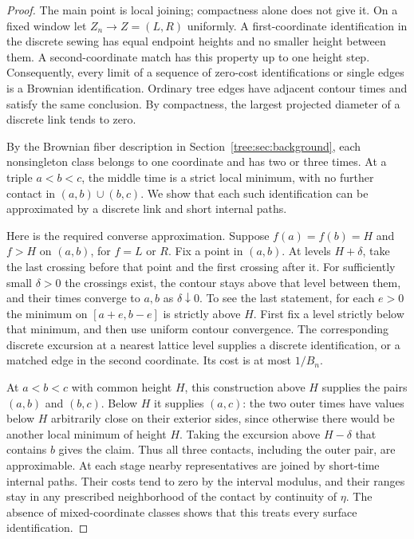 \begin{proof}
The main point is local joining; compactness alone does not give it.
On a fixed window let
$Z_n\to Z=(L,R)$ uniformly.  A first-coordinate identification in the
discrete sewing has equal endpoint heights and no smaller height between
them.  A second-coordinate match has this property up to one height step.
Consequently, every limit of a sequence of zero-cost identifications or
single edges is a Brownian identification.  Ordinary tree edges have
adjacent contour times and satisfy the same conclusion.  By compactness,
the largest projected diameter of a discrete link tends to zero.

By the Brownian fiber description in Section~\ref{tree:sec:background},
each nonsingleton class belongs to one coordinate and has two or three
times. At a triple $a<b<c$, the middle time is a strict local minimum,
with no further contact in $(a,b)\cup(b,c)$. We show that each such
identification can be approximated by a discrete link and short
internal paths.

Here is the required converse approximation.  Suppose
$f(a)=f(b)=H$ and $f>H$ on $(a,b)$, for $f=L$ or $R$.  Fix a point in
$(a,b)$.  At levels $H+\delta$, take the last crossing before that point
and the first crossing after it.  For sufficiently small $\delta>0$ the
crossings exist, the contour stays above that level between them, and
their times converge to $a,b$ as $\delta\downarrow0$.  To see the last
statement, for each $e>0$ the minimum on $[a+e,b-e]$ is strictly above
$H$.  First fix a level strictly below that minimum, and then use uniform
contour convergence.  The corresponding discrete excursion at a nearest
lattice level supplies a discrete identification, or a matched edge in
the second coordinate.  Its cost is at most $1/B_n$.

At $a<b<c$ with common height $H$, this construction above $H$ supplies
the pairs $(a,b)$ and $(b,c)$.  Below $H$ it supplies $(a,c)$: the two
outer times have values below $H$ arbitrarily close on their exterior
sides, since otherwise there would be another local minimum of height
$H$.  Taking the excursion above $H-\delta$ that contains $b$ gives the
claim.  Thus all three contacts, including the outer pair, are
approximable.  At each stage nearby representatives are joined by
short-time internal paths.  Their costs tend to zero by the interval
modulus, and their ranges stay in any prescribed neighborhood of the
contact by continuity of $\eta$.  The absence of mixed-coordinate
classes shows that this treats every surface identification.


\end{proof}
